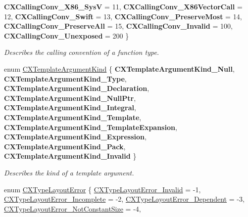 \begin{DoxyCompactItemize}
{\bfseries C\+X\+Calling\+Conv\+\_\+\+X86\+\_\+SysV} = 11, 
\newline
{\bfseries C\+X\+Calling\+Conv\+\_\+\+X86\+Vector\+Call} = 12, 
{\bfseries C\+X\+Calling\+Conv\+\_\+\+Swift} = 13, 
{\bfseries C\+X\+Calling\+Conv\+\_\+\+Preserve\+Most} = 14, 
{\bfseries C\+X\+Calling\+Conv\+\_\+\+Preserve\+All} = 15, 
\newline
{\bfseries C\+X\+Calling\+Conv\+\_\+\+Invalid} = 100, 
{\bfseries C\+X\+Calling\+Conv\+\_\+\+Unexposed} = 200
 \}
\begin{DoxyCompactList}\small\item\em Describes the calling convention of a function type. \end{DoxyCompactList}\item 
enum \mbox{\hyperlink{group__CINDEX__TYPES_gaf23c39e68c1fc756643583b43ee3e494}{C\+X\+Template\+Argument\+Kind}} \{ \newline
{\bfseries C\+X\+Template\+Argument\+Kind\+\_\+\+Null}, 
{\bfseries C\+X\+Template\+Argument\+Kind\+\_\+\+Type}, 
{\bfseries C\+X\+Template\+Argument\+Kind\+\_\+\+Declaration}, 
{\bfseries C\+X\+Template\+Argument\+Kind\+\_\+\+Null\+Ptr}, 
\newline
{\bfseries C\+X\+Template\+Argument\+Kind\+\_\+\+Integral}, 
{\bfseries C\+X\+Template\+Argument\+Kind\+\_\+\+Template}, 
{\bfseries C\+X\+Template\+Argument\+Kind\+\_\+\+Template\+Expansion}, 
{\bfseries C\+X\+Template\+Argument\+Kind\+\_\+\+Expression}, 
\newline
{\bfseries C\+X\+Template\+Argument\+Kind\+\_\+\+Pack}, 
{\bfseries C\+X\+Template\+Argument\+Kind\+\_\+\+Invalid}
 \}
\begin{DoxyCompactList}\small\item\em Describes the kind of a template argument. \end{DoxyCompactList}\item 
enum \mbox{\hyperlink{group__CINDEX__TYPES_gaaf1b95e9e7e792a08654563fef7502c1}{C\+X\+Type\+Layout\+Error}} \{ \newline
\mbox{\hyperlink{group__CINDEX__TYPES_ggaaf1b95e9e7e792a08654563fef7502c1a8af753af7c2bb465ffbf94112097294a}{C\+X\+Type\+Layout\+Error\+\_\+\+Invalid}} = -\/1, 
\mbox{\hyperlink{group__CINDEX__TYPES_ggaaf1b95e9e7e792a08654563fef7502c1a164e94efee026bd69cd70bc6034c2bb5}{C\+X\+Type\+Layout\+Error\+\_\+\+Incomplete}} = -\/2, 
\mbox{\hyperlink{group__CINDEX__TYPES_ggaaf1b95e9e7e792a08654563fef7502c1a1afb8a0cc940a15ecc7e660627d33405}{C\+X\+Type\+Layout\+Error\+\_\+\+Dependent}} = -\/3, 
\mbox{\hyperlink{group__CINDEX__TYPES_ggaaf1b95e9e7e792a08654563fef7502c1a669a4b303270bb38a2332f98db875c76}{C\+X\+Type\+Layout\+Error\+\_\+\+Not\+Constant\+Size}} = -\/4, 

\end{DoxyCompactItemize}
